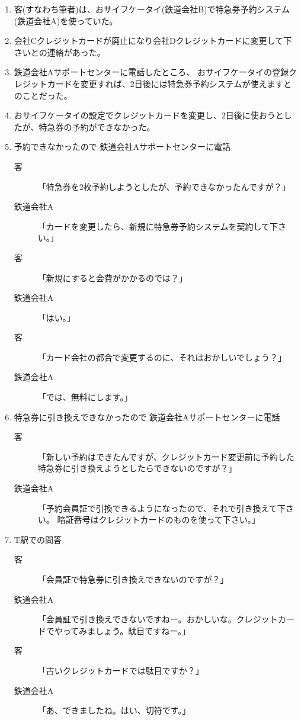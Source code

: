 \begin{enumerate}
\item 客(すなわち筆者)は、おサイフケータイ(鉄道会社B)で特急券予約システム(鉄道会社A)を使っていた。
\item 会社Cクレジットカードが廃止になり会社Dクレジットカードに変更して下さいとの連絡があった。
\item 鉄道会社Aサポートセンターに電話したところ、
	おサイフケータイの登録クレジットカードを変更すれば、2日後には特急券予約システムが使えますとのことだった。
\item おサイフケータイの設定でクレジットカードを変更し、2日後に使おうとしたが、特急券の予約ができなかった。
\item 予約できなかったので 鉄道会社Aサポートセンターに電話

	\begin{description}
	\item [客]「特急券を2枚予約しようとしたが、予約できなかったんですが？」
	\item [鉄道会社A]「カードを変更したら、新規に特急券予約システムを契約して下さい。」
	\item [客]「新規にすると会費がかかるのでは？」
	\item [鉄道会社A]「はい。」
	\item [客]「カード会社の都合で変更するのに、それはおかしいでしょう？」
	\item [鉄道会社A]「では、無料にします。」
	\end{description}

\item 特急券に引き換えできなかったので 鉄道会社Aサポートセンターに電話

	\begin{description}
	\item [客]「新しい予約はできたんですが、クレジットカード変更前に予約した特急券に引き換えようとしたらできないのですが？」
	\item [鉄道会社A]「予約会員証で引換できるようになったので、それで引き換えて下さい。
			暗証番号はクレジットカードのものを使って下さい。」
	\end{description}

\item T駅での問答

	\begin{description}
	\item [客]「会員証で特急券に引き換えできないのですが？」
	\item [鉄道会社A]「会員証で引き換えできないですねー。おかしいな。クレジットカードでやってみましょう。駄目ですねー。」
	\item [客]「古いクレジットカードでは駄目ですか？」
	\item [鉄道会社A]「あ、できましたね。はい、切符です。」
	\end{description}

\end{enumerate}

